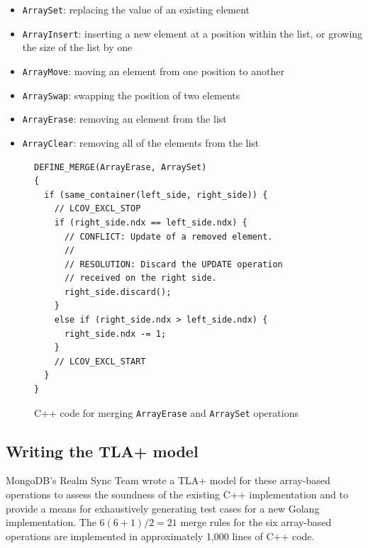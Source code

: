 \documentclass{vldb}
\begin{document}
\begin{itemize}
  \item \texttt{ArraySet}: replacing the value of an existing element
  \item \texttt{ArrayInsert}: inserting a new element at a position within the list, or growing the size of the list by one
  \item \texttt{ArrayMove}: moving an element from one position to another
  \item \texttt{ArraySwap}: swapping the position of two elements
  \item \texttt{ArrayErase}: removing an element from the list
  \item \texttt{ArrayClear}: removing all of the elements from the list
\end{itemize}

\begin{figure}
\begin{verbatim}
DEFINE_MERGE(ArrayErase, ArraySet)
{
  if (same_container(left_side, right_side)) {
    // LCOV_EXCL_STOP
    if (right_side.ndx == left_side.ndx) {
      // CONFLICT: Update of a removed element.
      //
      // RESOLUTION: Discard the UPDATE operation
      // received on the right side.
      right_side.discard();
    }
    else if (right_side.ndx > left_side.ndx) {
      right_side.ndx -= 1;
    }
    // LCOV_EXCL_START
  }
}
\end{verbatim}
\caption{C++ code for merging \texttt{ArrayErase} and \texttt{ArraySet} operations}
\label{fig:cpp_erase_set_merge}
\end{figure}

\subsection{Writing the TLA+ model}
\label{subsec:mbtcg_tlaplus}

MongoDB's Realm Sync Team wrote a TLA+ model for these array-based operations to assess the soundness of the existing C++ implementation and to provide a means for exhaustively generating test cases for a new Golang implementation. The $6 (6 + 1) / 2 = 21$ merge rules for the six array-based operations are implemented in approximately 1,000 lines of C++ code.

\end{document}
